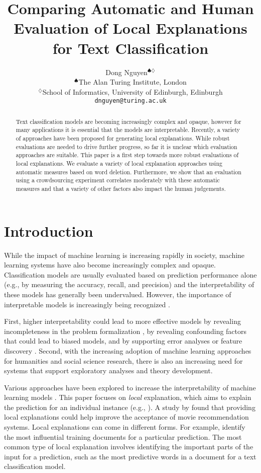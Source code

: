 \documentclass[11pt,a4paper]{article}
\title{Comparing Automatic and Human Evaluation of  Local Explanations  for Text Classification}
\author{Dong Nguyen$^{\spadesuit\diamondsuit}$  \\
$^{\spadesuit}$The Alan Turing Institute, London \\
$^{\diamondsuit}$School of Informatics, University of Edinburgh, Edinburgh  \\
 {\tt dnguyen@turing.ac.uk}
 }
\date{}
\begin{document}
\maketitle
\begin{abstract}
Text classification models are  becoming increasingly complex and opaque, however
for many applications it is essential that the models are interpretable.
Recently, a variety of approaches have been proposed for generating local explanations. While robust evaluations are needed
to drive further progress, so far it is unclear which evaluation approaches are suitable. 
This paper is a first step towards more robust evaluations of local explanations.
We evaluate a variety of local explanation approaches using automatic measures based on word deletion. Furthermore, we show that an evaluation using a crowdsourcing experiment correlates moderately with these automatic measures and that a variety of other factors also impact the human judgements.
\end{abstract}

\section{Introduction}

While the impact of machine learning   is increasing rapidly in society, machine learning systems have also become increasingly complex and opaque. 
Classification models are usually evaluated based on prediction performance alone (e.g., by measuring the accuracy, recall, and precision) and the interpretability of these models has generally been undervalued. However, the importance of interpretable models is increasingly being recognized \cite{towards2017,Freitas:2014:CCM:2594473.2594475}.

First, higher interpretability could lead to more effective models by revealing incompleteness in the problem formalization \cite{towards2017}, by revealing 
 confounding factors that could  lead to biased models, and by supporting  error analyses or  feature discovery \cite{aubakirova-bansal:2016:EMNLP2016}.  Second, with the increasing adoption of machine learning approaches for humanities and social science research, there is also an increasing need for systems that support exploratory analyses and theory development.


Various approaches have been explored to increase the interpretability of machine learning models  \cite{DBLP:journals/corr/Lipton16a}. 
This paper focuses on  \emph{local} explanation, which aims to explain the prediction for an individual instance  (e.g.,  \citet{Ribeiro:2016:WIT:2939672.2939778}). 
A study by \citet{Herlocker:2000:ECF:358916.358995}  found that providing local explanations could help improve the acceptance of movie recommendation systems. Local explanations can come in different forms.
For example, \citet{koh2017understanding} identify the most influential training documents for a particular prediction. The most common type of local explanation involves identifying the  important parts of the input for a prediction, such as the most predictive words in a document for a text classification model. 
\end{document}

